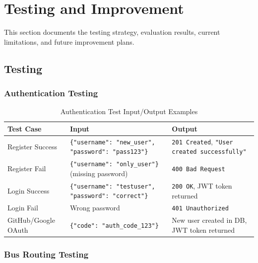\chapter{Testing and Improvement}
\label{chap:testing-improvement}

This section documents the testing strategy, evaluation results, current limitations, and future improvement plans.

\section{Testing}


\subsection{Authentication Testing}

\begin{table}[H]
    \centering
    \renewcommand{\arraystretch}{1.3}
    \footnotesize
    \begin{tabularx}{\textwidth}{|p{2.5cm}|p{4.5cm}|X|}
        \hline
        \textbf{Test Case} & \textbf{Input} & \textbf{Output} \\
        \hline
        Register Success & \texttt{\{"username": "new\_user", "password": "pass123"\}} & \texttt{201 Created}, \texttt{"User created successfully"} \\
        \hline
        Register Fail & \texttt{\{"username": "only\_user"\}} (missing password) & \texttt{400 Bad Request} \\
        \hline
        Login Success & \texttt{\{"username": "testuser", "password": "correct"\}} & \texttt{200 OK}, JWT token returned \\
        \hline
        Login Fail & Wrong password & \texttt{401 Unauthorized} \\
        \hline
        GitHub/Google OAuth & \texttt{\{"code": "auth\_code\_123"\}} & New user created in DB, JWT token returned \\
        \hline
    \end{tabularx}
    \caption{Authentication Test Input/Output Examples}
\end{table}

\subsection{Bus Routing Testing}

